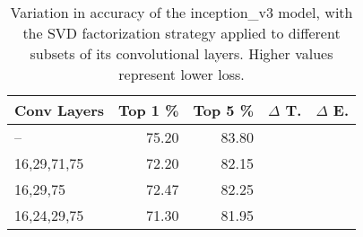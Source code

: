 \begin{table}
\centering
\begin{tabular}{|l|r|r|r|r|}
\hline
Conv Layers & Top 1 \% & Top 5 \% & $\Delta$ T. & $\Delta$ E. \\\hline
-- & 75.20 & 83.80  &  & \\\hline
16,29,71,75 & 72.20 & 82.15 &  &  \\\hline
16,29,75 & 72.47 & 82.25 &  &  \\\hline
16,24,29,75 & 71.30 & 81.95 &  &  \\\hline
\end{tabular}
\caption{Variation in accuracy of the inception\_v3 model, with the SVD factorization strategy applied to different subsets of its convolutional layers. Higher values represent lower loss.}
\label{inception_v3-accuracy}
\end{table}
